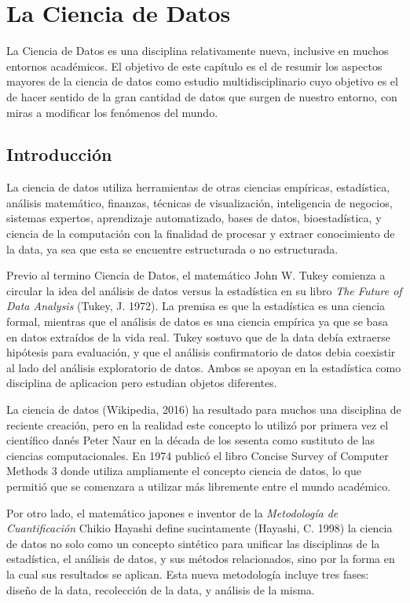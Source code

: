 \documentclass[letterpaper, spanish, 11pt]{report}
\begin{document}
\section{La Ciencia de Datos}
La Ciencia de Datos es una disciplina relativamente nueva, inclusive en muchos entornos académicos. El objetivo de este capítulo es el de resumir los aspectos mayores de la ciencia de datos como estudio multidisciplinario cuyo objetivo es el de hacer sentido de la gran cantidad de datos que surgen de nuestro entorno, con miras a modificar los fenómenos del mundo.

\subsection{Introducción}
La ciencia de datos \cite{zumelMount} utiliza herramientas de otras ciencias empíricas, estadística, análisis matemático, finanzas, técnicas de visualización, inteligencia de negocios, sistemas expertos, aprendizaje automatizado, bases de datos, bioestadística, y ciencia de la computación con la finalidad de procesar y extraer conocimiento de la data, ya sea que esta se encuentre estructurada o no estructurada. 

Previo al termino Ciencia de Datos, el matemático John W. Tukey comienza a circular la idea del análisis de datos versus la estadística en su libro \textit{The Future of Data Analysis} (Tukey, J. 1972). La premisa es que la estadística es una ciencia formal, mientras que el análisis de datos es una ciencia empírica ya que se basa en datos extraídos de la vida real. Tukey sostuvo que de la data debía extraerse hipótesis para evaluación, y que el análisis confirmatorio de datos debia coexistir al lado del análisis exploratorio de datos. Ambos se apoyan en la estadística como disciplina de aplicacion pero estudian objetos diferentes. 

La ciencia de datos (Wikipedia, 2016) ha resultado para muchos una disciplina de reciente creación, pero en la realidad este concepto lo utilizó por primera vez el científico danés Peter Naur en la década de los sesenta como sustituto de las ciencias computacionales. En 1974 publicó el libro Concise Survey of Computer Methods 3 donde utiliza ampliamente el concepto ciencia de datos, lo que permitió que se comenzara a utilizar más libremente entre el mundo académico.  

Por otro lado, el matemático japones e inventor de la \textit{Metodología de Cuantificación} Chikio Hayashi define sucintamente (Hayashi, C. 1998) la ciencia de datos no solo como un concepto sintético para unificar las disciplinas de la estadística, el análisis de datos, y sus métodos relacionados, sino por la forma en la cual sus resultados se aplican. Esta nueva metodología incluye tres fases: diseño de la data, recolección de la data, y análisis de la misma. 
\end{document}
